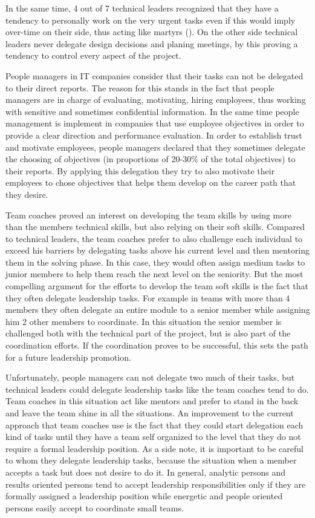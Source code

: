 In the same time, 4 out of 7 technical leaders recognized that they have a tendency to personally work on the very urgent tasks even if this would imply over-time on their side, thus acting like martyrs (\cite{toxic}). On the other side technical leaders never delegate design decisions and planing meetings, by this proving a tendency to control every aspect of the project. 

People managers in IT companies consider that their tasks can not be delegated to their direct reports. The reason for this stands in the fact that people managers are in charge of evaluating, motivating, hiring employees, thus working with sensitive and sometimes confidential information. In the same time people management is implement in companies that use employee objectives in order to provide a clear direction and performance evaluation. In order to establish trust and motivate employees, people managers declared that they sometimes delegate the choosing of objectives (in proportions of 20-30\% of the total objectives) to their reports. By applying this delegation they try to also motivate their employees to chose objectives that helps them develop on the career path that they desire.

Team coaches proved an interest on developing the team skills by using more than the members technical skills, but also relying on their soft skills. Compared to technical leaders, the team coaches prefer to also challenge each individual to exceed his barriers by delegating tasks above his current level and then mentoring them in the solving phase. In this case, they would often assign medium tasks to junior members to help them reach the next level on the seniority. But the most compelling argument for the efforts to develop the team soft skills is the fact that they often delegate leadership tasks. For example in teams with more than 4 members they often delegate an entire module to a senior member while assigning him 2 other members to coordinate. In this situation the senior member is challenged both with the technical part of the project, but is also part of the coordination efforts. If the coordination proves to be successful, this sets the path for a future leadership promotion.

Unfortunately, people managers can not delegate two much of their tasks, but technical leaders could delegate leadership tasks like the team coaches tend to do. Team coaches in this situation act like mentors and prefer to stand in the back and leave the team shine in all the situations. An improvement to the current approach that team coaches use is the fact that they could start delegation each kind of tasks until they have a team self organized to the level that they do not require a formal leadership position. As a side note, it is important to be careful to whom they delegate leadership tasks, because the situation when a member accepts a task but does not desire to do it. 
In general, analytic persons and results oriented persons tend to accept leadership responsibilities only if they are formally assigned a leadership position while energetic and people oriented persons easily accept to coordinate small teams.

